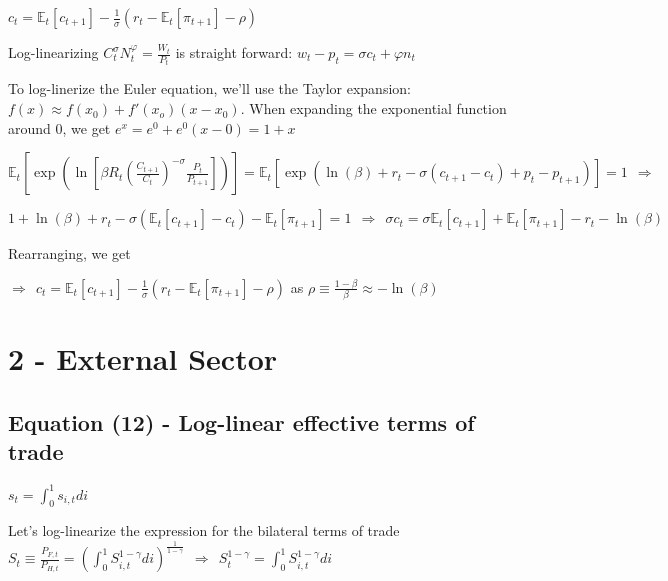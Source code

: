\documentclass[
]{article}
\begin{document}
\(\displaystyle c_t = \mathbb{E}_t \left[c_{t+1} \right] -\frac{1}{\sigma} \left( r_t - \mathbb{E}_t \left[ \pi_{t+1} \right] -\rho\right)\)

\vspace{8pt}

Log-linearizing
\(\displaystyle C_t^{\sigma}N_t^{\varphi} = \frac{W_t}{P_t}\) is
straight forward: \(w_t - p_t = \sigma c_t + \varphi n_t\)

To log-linerize the Euler equation, we'll use the Taylor expansion:
\(f(x) \approx f(x_0) + f'(x_o)(x-x_0)\). When expanding the exponential
function around 0, we get \(e^x=e^0+e^0(x-0)=1+x\)

\(\mathbb{E}_t \left[ \exp \left( \ln \left[ \beta R_t \left( \frac{C_{t+1}}{C_t} \right)^{-\sigma} \frac{P_t}{P_{t+1}} \right] \right) \right] = \mathbb{E}_t \left[ \exp \left( \ln(\beta) + r_t -\sigma(c_{t+1}-c_t) + p_t - p_{t+1} \right) \right] = 1 \ \ \Rightarrow\)

\(\displaystyle 1 + \ln(\beta) + r_t -\sigma(\mathbb{E}_t \left[c_{t+1} \right]-c_t) - \mathbb{E}_t \left[ \pi_{t+1} \right] = 1 \ \ \Rightarrow \ \ \sigma c_t = \sigma \mathbb{E}_t \left[c_{t+1} \right] + \mathbb{E}_t \left[ \pi_{t+1} \right] - r_t - \ln(\beta)\)

Rearranging, we get

\(\displaystyle \Rightarrow \ \ c_t = \mathbb{E}_t \left[c_{t+1} \right] -\frac{1}{\sigma} \left( r_t - \mathbb{E}_t \left[ \pi_{t+1} \right] -\rho\right)\)
as
\(\displaystyle \rho \equiv \frac{1-\beta}{\beta} \approx -\ln(\beta)\)

\vspace{12pt}

\hypertarget{external-sector}{%
\section{2 - External Sector}\label{external-sector}}

\hypertarget{equation-12---log-linear-effective-terms-of-trade}{%
\subsection{Equation (12) - Log-linear effective terms of
trade}\label{equation-12---log-linear-effective-terms-of-trade}}

\(\displaystyle s_t = \int_0^1 s_{i,t}di\)

\vspace{8pt}

Let's log-linearize the expression for the bilateral terms of trade
\(\displaystyle S_t \equiv \frac{P_{F,t}}{P_{H,t}}= \left( \int_0^1 S_{i,t}^{1-\gamma}di \right)^{\frac{1}{1-\gamma}} \ \ \Rightarrow \ \ S_t^{1-\gamma} = \int_0^1 S_{i,t}^{1-\gamma}di\)
\end{document}
